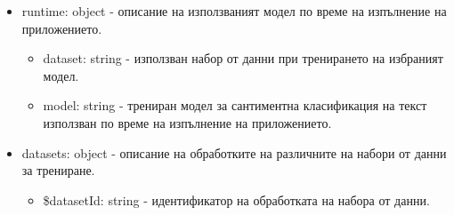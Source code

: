 \documentclass{article}
\begin{document}
\begin{itemize}

  \item runtime: object - описание на използваният модел по време на изпълнение на приложението.

  \begin{itemize}

    \item dataset: string - използван набор от данни при тренирането на избраният модел.
    \item model: string - трениран модел за сантиментна класификация на текст използван по време на изпълнение на
    приложението.

  \end{itemize}

  \item datasets: object - описание на обработките на различните на набори от данни за трениране.

  \begin{itemize}

    \item \$datasetId: string - идентификатор на обработката на набора от данни.

    \begin{itemize}


\end{itemize}
\end{itemize}
\end{itemize}
\end{document}
